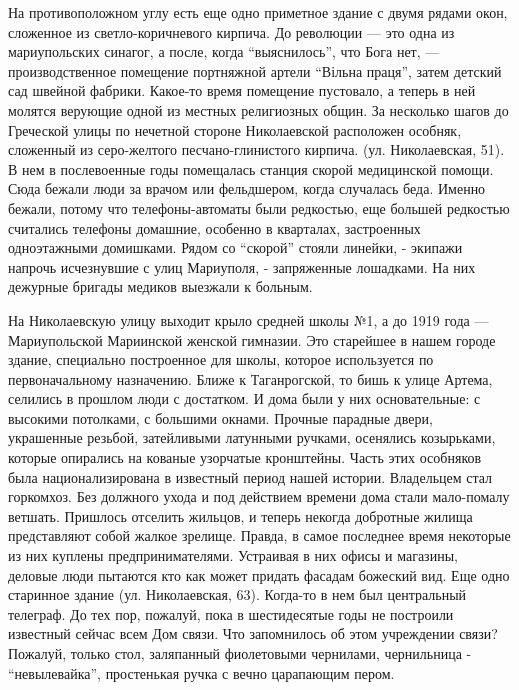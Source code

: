 На противоположном углу есть еще одно приметное здание с двумя рядами окон,
сложенное из светло-коричневого кирпича. До революции — это одна из
мариупольских синагог, а после, когда \enquote{выяснилось}, что  Бога нет,  —
производственное помещение портняжной артели \enquote{Вільна праця}, затем детский сад
швейной фабрики. Какое-то время помещение пустовало, а теперь в ней молятся
верующие одной из местных религиозных общин. За несколько шагов до Греческой
улицы по нечетной стороне Николаевской расположен особняк, сложенный из
серо-желтого песчано-глинистого кирпича. (ул. Николаевская, 51).  В нем в
послевоен­ные годы помещалась станция скорой медицинской помощи. Сюда бежали
люди за врачом или фельдшером, когда случалась беда. Именно бежали, потому что
телефоны-автоматы были редкостью, еще большей редкостью считались телефоны
домашние, особенно в кварталах, застроенных одноэтажными домишками. Рядом со
\enquote{скорой} стояли линейки, - экипажи напрочь исчезнувшие с улиц Мариуполя, -
запряженные лошадками. На них дежурные бригады медиков выезжали к больным.


На Николаевскую улицу выходит крыло средней школы №1, а до 1919 года —
Мариупольской Мариинской женской гимназии. Это старейшее в нашем городе здание,
специально построенное для школы, которое используется по первоначальному
назначению. Ближе к Таганрогской, то бишь к улице Артема, селились в прошлом
люди с достатком. И дома были у них основа­тельные: с высокими потолками, с
большими окнами. Прочные парадные двери, украшенные резьбой, затейливыми
латунными ручками, осенялись козырьками, которые опирались на кованые узорчатые
кронштейны. Часть этих особняков была национализирована в известный период
нашей истории. Владельцем стал горкомхоз. Без должного ухода и под действием
времени дома стали мало-помалу ветшать. Пришлось отселить жильцов, и теперь
некогда добротные жилища представляют собой жалкое зрелище. Правда, в самое
последнее время некоторые из них куплены предпри­нимателями. Устраивая в них
офисы и магазины, деловые люди пытаются кто как может придать фасадам божеский
вид. Еще одно старинное здание (ул. Николаевская, 63). Когда-то в нем был
центральный телеграф. До тех пор, пожалуй, пока в шестидеся­тые годы не
построили известный сейчас всем Дом связи. Что запомнилось об этом учреждении
связи? Пожалуй, только стол, заляпанный фиолетовыми чернилами, чернильница -
\enquote{невылевайка}, простенькая ручка с вечно царапающим пером.

